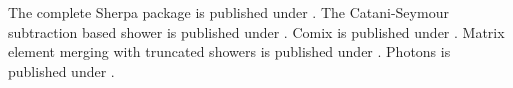 \documentclass{article}
\begin{document}
The complete Sherpa package is published under \cite{Gleisberg:2008ta}.
The Catani-Seymour subtraction based shower is published under \cite{Schumann:2007mg}.
Comix is published under \cite{Gleisberg:2008fv}.
Matrix element merging with truncated showers is published under \cite{Hoeche:2009rj}.
Photons is published under \cite{Schonherr:2008av}.
\end{document}
